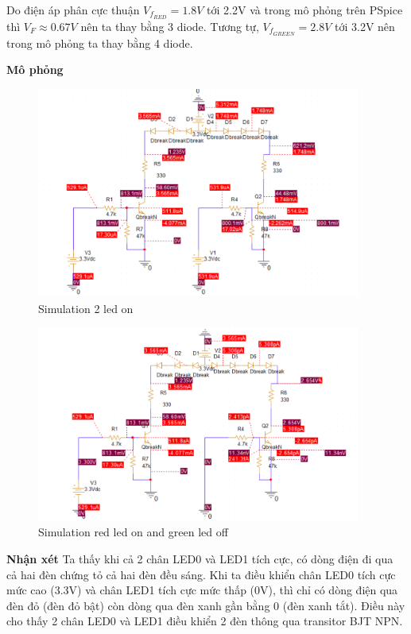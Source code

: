 Do điện áp phân cực thuận $V_{f_{RED}} = 1.8V$ tới 2.2V và trong mô phỏng trên PSpice thì $V_F \approx 0.67 V$ nên ta thay bằng 3 diode.
Tương tự, $V_{f_{GREEN}} = 2.8V$ tới 3.2V nên trong mô phỏng ta thay bằng 4 diode.

\pagebreak

\textbf{Mô phỏng}

\begin{figure}[ht]
    \centering
    \includegraphics[width=0.95\textwidth]{graphics/section4/f5.png}
    \caption{Simulation 2 led on}
\end{figure}

\begin{figure}[ht]
    \centering
    \includegraphics[width=0.95\textwidth]{graphics/section4/f6.png}
    \caption{Simulation red led on and green led off}
\end{figure}

\pagebreak

\textbf{Nhận xét} Ta thấy khi cả 2 chân LED0 và LED1 tích cực, có dòng điện đi qua cả hai đèn chứng tỏ cả hai đèn đều sáng. Khi ta điều khiển chân LED0 tích cực mức cao (3.3V) và chân LED1 tích cực mức thấp (0V), thì chỉ có dòng điện qua đèn đỏ (đèn đỏ bật) còn dòng qua đèn xanh gần bằng 0 (đèn xanh tắt). Điều này cho thấy 2 chân LED0 và LED1 điều khiển 2 đèn thông qua transitor BJT NPN.
